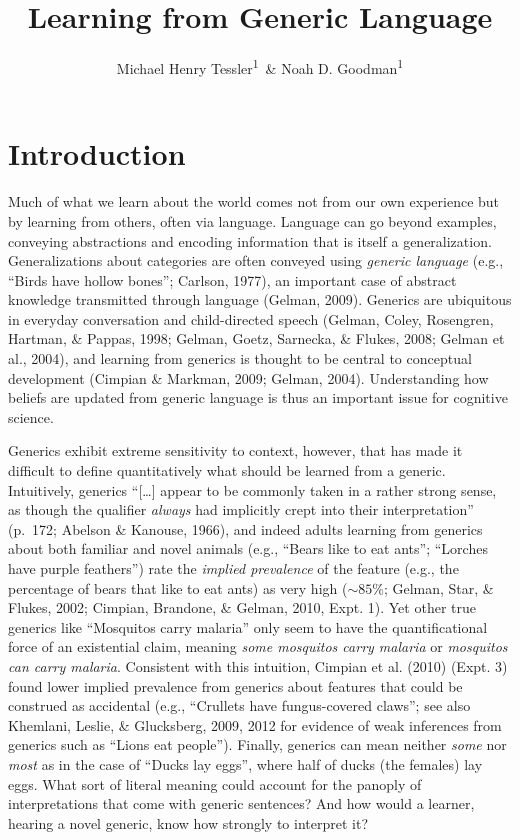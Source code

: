 \documentclass[floatsintext,doc]{apa6}
\title{Learning from Generic Language}
\author{Michael Henry Tessler\textsuperscript{1}~\& Noah D. Goodman\textsuperscript{1}}
\date{}
\affiliation{
\vspace{0.5cm}
\textsuperscript{1} Department of Psychology, Stanford University}
\begin{document}
\maketitle



\hypertarget{introduction}{%
\section{Introduction}\label{introduction}}

Much of what we learn about the world comes not from our own experience but by learning from others, often via language.
Language can go beyond examples, conveying abstractions and encoding information that is itself a generalization.
Generalizations about categories are often conveyed using \emph{generic language} (e.g., ``Birds have hollow bones''; Carlson, 1977), an important case of abstract knowledge transmitted through language (Gelman, 2009).
Generics are ubiquitous in everyday conversation and child-directed speech (Gelman, Coley, Rosengren, Hartman, \& Pappas, 1998; Gelman, Goetz, Sarnecka, \& Flukes, 2008; Gelman et al., 2004), and learning from generics is thought to be central to conceptual development (Cimpian \& Markman, 2009; Gelman, 2004).
Understanding how beliefs are updated from generic language is thus an important issue for cognitive science.

Generics exhibit extreme sensitivity to context, however, that has made it difficult to define quantitatively what should be learned from a generic.
Intuitively, generics \enquote{{[}\ldots{}{]} appear to be commonly taken in a rather strong sense, as though the qualifier \emph{always} had implicitly crept into their interpretation} (p.~172; Abelson \& Kanouse, 1966), and indeed adults learning from generics about both familiar and novel animals (e.g., \enquote{Bears like to eat ants}; \enquote{Lorches have purple feathers}) rate the \emph{implied prevalence} of the feature (e.g., the percentage of bears that like to eat ants) as very high (\(\sim 85\%\); Gelman, Star, \& Flukes, 2002; Cimpian, Brandone, \& Gelman, 2010, Expt. 1).
Yet other true generics like \enquote{Mosquitos carry malaria} only seem to have the quantificational force of an existential claim, meaning \emph{some mosquitos carry malaria} or \emph{mosquitos can carry malaria}.
Consistent with this intuition, Cimpian et al. (2010) (Expt. 3) found lower implied prevalence from generics about features that could be construed as accidental (e.g., ``Crullets have fungus-covered claws''; see also Khemlani, Leslie, \& Glucksberg, 2009, 2012 for evidence of weak inferences from generics such as ``Lions eat people'').
Finally, generics can mean neither \emph{some} nor \emph{most} as in the case of \enquote{Ducks lay eggs}, where half of ducks (the females) lay eggs.
What sort of literal meaning could account for the panoply of interpretations that come with generic sentences?
And how would a learner, hearing a novel generic, know how strongly to interpret it?
\end{document}
